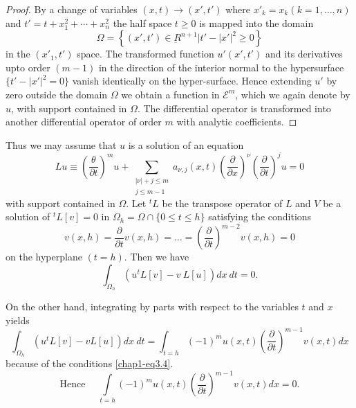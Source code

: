\begin{proof}
By a change of variables $(x, t) \rightarrow (x',  t')$ where $x'_k =
x_k (k=1,  \ldots,  n)$ and $t' = t + x^2_1 + \cdots + x^2_n$ the half
space $t \geq 0$ is mapped into the domain 
$$
\Omega =\left\{ (x',  t') \in \underbar{R}^{n+1} \bigg|  t'- |x'|^2  
\geq 0\right\} 
$$
in the $(x'_1, t')$ space. The transformed function $u'(x',  t')$ and
its derivatives upto order $(m-1)$ in the direction of the interior
normal to the hypersurface $\{t' - |x'|^2 =0\}$ vanish identically
on the hyper-surface. Hence extending $u'$ by zero outside the domain
$\Omega$ we obtain a function in $\mathscr{E}^m$,  which we again
denote by $u$, with support contained in $\Omega$. The differential
operator is transformed into another differential operator of order
$m$ with analytic coefficients.  
\end{proof}

Thus we may assume that $u$ is a solution of an equation 
\begin{equation}
L u \equiv \left(\frac{\theta}{\partial t}\right)^m u+ \sum_{\substack{| \nu |
    + j \leq m\\ j\leq m-1}} a_{\nu,  j} (x,
t)\left(\frac{\partial}{\partial x}\right)^\nu
\left(\frac{\partial}{\partial t}\right)^j 
u=0 \tag{3.3} \label{chap1-eq3.3}
\end{equation}\pageoriginale
with support contained in $\Omega$. Let ${}^tL$ be the transpose
operator of $L$ and $V$ be a solution of ${}^tL [v] =0$ in $\Omega_h =
\Omega \cap \{0 \leq t \leq h\}$ satisfying the conditions  
\begin{equation}
v(x,  h) = \frac{\partial}{\partial t} v(x,  h) = \ldots =
\left(\frac{\partial}{\partial t}\right)^{m-2} v(x,  h) = 0
\tag{3.4} \label{chap1-eq3.4} 
\end{equation}
on the hyperplane $(t = h)$. Then we have
\begin{equation}
\int_{\Omega_h}(u  ^t L[v] - v\ L [u]) dx ~ dt = 0.\tag{3.5}\label{chap1-eq3.5}
\end{equation}

On the other hand,  integrating by parts with respect to the variables
$t$ and $x$ yields 
$$
\int_{\Omega_h}(u{}^t L [v] - v L [u]) dx ~dt = \int_{t=h} (-1)^m u(x,
t)\left(\frac{\partial}{\partial t}\right)^{m-1} v(x,  t) dx 
$$
because of the conditions  \eqref{chap1-eq3.4}.
\begin{equation}
\text{Hence } \quad \int\limits_{t=h} (-1)^m
u(x,t)\left(\frac{\partial}{\partial t}\right)^{m-1} v(x,  t)
dx=0. \tag{3.6}\label{chap1-eq3.6}   
\end{equation}

